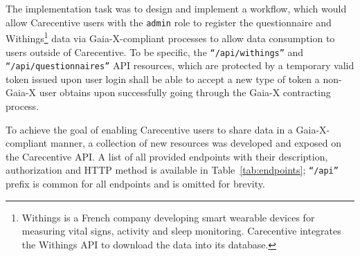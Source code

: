 The implementation task was to design and implement a workflow, which would allow Carecentive users with the \texttt{admin} role to register the questionnaire and Withings\footnote{Withings is a French company developing smart wearable devices for measuring vital signs, activity and sleep monitoring. Carecentive integrates the Withings API to download the data into its database.} data via Gaia-X-compliant processes to allow data consumption to users outside of Carecentive.
To be specific, the \texttt{``/api/withings''} and \texttt{``/api/questionnaires''} API resources, which are protected by a temporary valid token issued upon user login shall be able to accept a new type of token a non-Gaia-X user obtains upon successfully going through the Gaia-X contracting process.

To achieve the goal of enabling Carecentive users to share data in a Gaia-X-compliant manner, a collection of new resources was developed and exposed on the Carecentive API.
A list of all provided endpoints with their description, authorization and HTTP method is available in Table~\ref{tab:endpoints}; \texttt{``/api''} prefix is common for all endpoints and is omitted for brevity.

